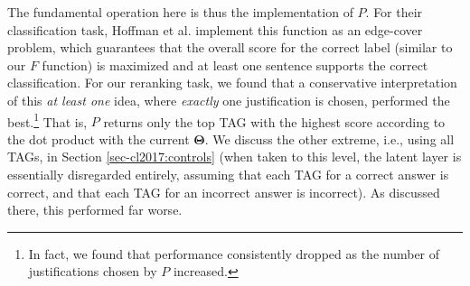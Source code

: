The fundamental operation here is thus the implementation of $P$. For their classification task, Hoffman et al. implement this function as an edge-cover problem, which guarantees that the overall score for the correct label (similar to our $F$ function) is maximized and at least one sentence supports the correct classification.  
For our reranking task, we found that a conservative interpretation of this {\em at least one} idea, where {\em exactly} one justification is chosen, performed the best.\footnote{In fact, we found that performance consistently dropped as the number of justifications chosen by $P$ increased.} That is, $P$ returns only the top TAG with the highest score according to the dot product with the current $\boldsymbol{\Theta}$. 
We discuss the other extreme, i.e., using all TAGs, in Section \ref{sec-cl2017:controls} (when taken to this level, the latent layer is essentially disregarded entirely, assuming that each TAG for a correct answer is correct, and that each TAG for an incorrect answer is incorrect).  As discussed there, this performed far worse.


